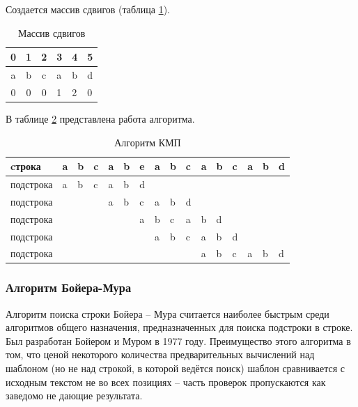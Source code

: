 \documentclass[a4paper,12pt]{article}
\begin{document}
Создается массив сдвигов (таблица \ref{table:example1}).

\begin{table}[H]
    \centering
    \caption{Массив сдвигов}
    \label{table:example1}
    \begin{tabular}{|c|c|c|l|l|l|}
    \hline
    0 & 1 & 2 & 3 & 4 & 5 \\ \hline
    a & b & c & a & b & d \\ \hline
    0 & 0 & 0 & 1 & 2 & 0 \\ \hline
    \end{tabular}
\end{table}

В таблице \ref{table:kmp} представлена работа алгоритма.

\begin{table}[H]
    \centering
    \caption{Алгоритм КМП}
    \label{table:kmp}
    \begin{tabular}{|l|l|l|l|l|l|l|l|l|l|l|l|l|l|l|l|}
    \hline
    cтрока & a & b & c & a & b & e  & a & b & c & a & b & c & a & b & d\\
    \hline
    подстрока & a & b & c & a & b & \cellcolor[HTML]{FE0000}d & & & & & & & & & \\
    \hline
    подстрока & & & & a & b & \cellcolor[HTML]{FE0000}c & a & b & d & & & & & & \\
    \hline
    подстрока & & & & & & \cellcolor[HTML]{FE0000}a & b & c & a & b & d & & & & \\
    \hline
    подстрока & & & & & & & a & b & c & a & b & \cellcolor[HTML]{FE0000}d & & & \\
    \hline
    подстрока & & & & & & & & & & \cellcolor[HTML]{34FF34}a & \cellcolor[HTML]{34FF34}b & \cellcolor[HTML]{34FF34}c & \cellcolor[HTML]{34FF34}a & \cellcolor[HTML]{34FF34}b & \cellcolor[HTML]{34FF34}d \\
    \hline
    \end{tabular}
\end{table}

\subsubsection{Алгоритм Бойера-Мура}

Алгоритм поиска строки Бойера -- Мура считается наиболее быстрым
среди алгоритмов общего назначения, предназначенных для поиска
подстроки в строке. Был разработан Бойером и Муром в 1977 году.
Преимущество этого алгоритма в том, что ценой некоторого количества
предварительных вычислений над шаблоном (но не над строкой, в которой
ведётся поиск) шаблон сравнивается с исходным текстом не во всех
позициях -- часть проверок пропускаются как заведомо не дающие
результата.
\end{document}
